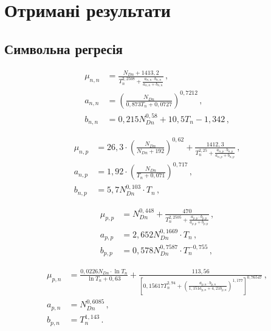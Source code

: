\documentclass[12pt,a4paper,titlepage,oneside]{book}
\numberwithin{equation}{part}
\begin{document}
\chapter{Отримані результати}

\section{Символьна регресія}

\begin{subequations} \label{eqNN}
    \begin{align}
      \mu_{n,n}& =\frac{N_{Dn}+1413,2}{T_n^{2,2508}+\frac{a_{n,n}\cdot b_{n,n}}{a_{n,n}+b_{n,n}}}\,, \label{eqNNa} \\
      a_{n,n} &=\left(\frac{N_{Dn}}{0,873T_n+0,0727}\right)^{0,7212}\,, \label{eqNNb} \\
      b_{n,n}& =0,215N_{Dn}^{0,58}+10,5T_n-1,342\,, \label{eqNNc}
    \end{align}
\end{subequations}

\begin{subequations} \label{eqNP}
    \begin{align}
      \mu_{n,p}& =26,3\cdot\left(\frac{N_{Dn}}{N_{Dn}+192}\right)^{0,62}+\frac{1412,3}{T_n^{2,25}+\frac{a_{n,p}\cdot b_{n,p}}{a_{n,p}+b_{n,p}}}\,, \label{eqNPa} \\
      a_{n,p} &=1,92\cdot\left(\frac{N_{Dn}}{T_n+0,071}\right)^{0,717}\,, \label{eqNPb} \\
      b_{n,p}& =5,7N_{Dn}^{0,103}\cdot T_n\,, \label{eqNPc}
    \end{align}
\end{subequations}


\begin{subequations} \label{eqPP}
    \begin{align}
      \mu_{p,p}& =N_{Dn}^{0,448}+\frac{470}{T_n^{2,2505}+\frac{a_{p,p}\cdot b_{p,p}}{a_{p,p}+b_{p,p}}}\,, \label{eqPPa} \\
      a_{p,p} &=2,652 N_{Dn}^{0,1669}\cdot T_n\,, \label{eqPPb} \\
      b_{p,p}& =0,578 N_{Dn}^{0,7587}\cdot T_n^{-0,755}\,, \label{eqPPc}
    \end{align}
\end{subequations}


\begin{subequations} \label{eqPN}
    \begin{align}
      \mu_{p,n}& =\frac{0,0226N_{Dn}\cdot\ln T_n}{\ln T_n+0,63}
      +\frac{113,56}{\left[0,15617T_n^{2,94}+\left(\frac{a_{p,n}\cdot b_{p,n}}{1,151a_{p,n}+ 4,21 b_{p,n}}\right)^{1,177}\right]^{0,76547}}\,, \label{eqPNa} \\
      a_{p,n} &=N_{Dn}^{0,6085}\,, \label{eqPNb} \\
      b_{p,n}& =T_n^{1,143}\,. \label{eqPNc}
    \end{align}
\end{subequations}
\end{document}

